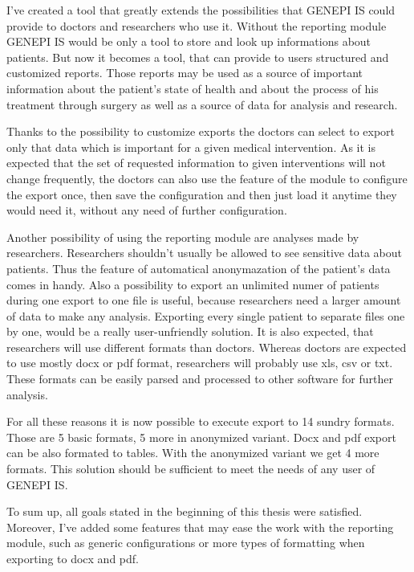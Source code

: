 \documentclass[thesis=B,english]{FITthesis}[2012/10/20]
\begin{document}
\begin{conclusion}
I've created a tool that greatly extends the possibilities that GENEPI IS could provide to doctors and researchers who use it. Without the reporting module GENEPI IS would be only a tool to store and look up informations about patients. But now it becomes a tool, that can provide to users structured and customized reports. Those reports may be used as a source of important information about the patient's state of health and about the process of his treatment through surgery as well as a source of data for analysis and research.

Thanks to the possibility to customize exports the doctors can select to export only that data which is important for a given medical intervention. As it is expected that the set of requested information to given interventions will not change frequently, the doctors can also use the feature of the module to configure the export once, then save the configuration and then just load it anytime they would need it, without any need of further configuration.

Another possibility of using the reporting module are analyses made by researchers. Researchers shouldn't usually be allowed to see sensitive data about patients. Thus the feature of automatical anonymazation of the patient's data comes in handy. Also a possibility to export an unlimited numer of patients during one export to one file is useful, because researchers need a larger amount of data to make any analysis. Exporting every single patient to separate files one by one, would be a really user-unfriendly solution. It is also expected, that researchers will use different formats than doctors. Whereas doctors are expected to use mostly docx or pdf format, researchers will probably use xls, csv or txt. These formats can be easily parsed and processed to other software for further analysis.

For all these reasons it is now possible to execute export to 14 sundry formats. Those are 5 basic formats, 5 more in anonymized variant. Docx and pdf export can be also formated to tables. With the anonymized variant we get 4 more formats. This solution should be sufficient to meet the needs of any user of GENEPI IS.

To sum up, all goals stated in the beginning of this thesis were satisfied. Moreover, I've added some features that may ease the work with the reporting module, such as generic configurations or more types of formatting when exporting to docx and pdf.


\end{conclusion}
\end{document}
